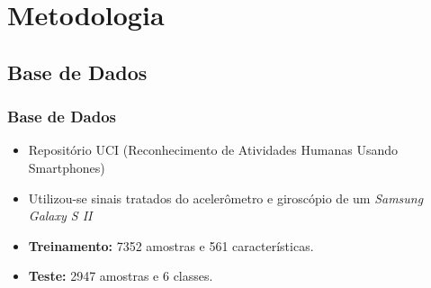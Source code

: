 \documentclass{beamer}
\begin{document}



%


\section{Metodologia}

\subsection{Base de Dados}
\begin{frame}\frametitle{Base de Dados}
	
	\begin{itemize}
		\item Repositório UCI (Reconhecimento de Atividades Humanas Usando Smartphones)%
		\item Utilizou-se sinais tratados do acelerômetro e giroscópio de um \textit{Samsung Galaxy S II}
		\item \textbf{ Treinamento: } 7352 amostras e 561 características.
		\item \textbf{ Teste: } 2947 amostras e 6 classes.
	\end{itemize}

\end{frame}
\end{document}
